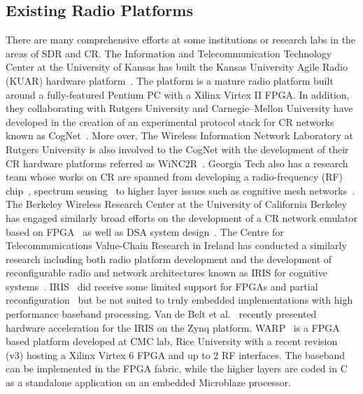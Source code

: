\subsection{Existing Radio Platforms}
There are many comprehensive efforts at some institutions or research labs in the areas of SDR and CR. 
The Information and Telecommunication Technology Center at the University of Kansas has built the Kansas University Agile Radio (KUAR) hardware platform~\cite{Minden2007}. 
The platform is a mature radio platform built around a fully-featured Pentium PC with a Xilinx Virtex II FPGA.
In addition, they collaborating with Rutgers University and Carnegie–Mellon University have developed in the creation of an experimental protocol stack for CR networks known as CogNet~\cite{Raychaudhuri2006}. 
More over, The Wireless Information Network Laboratory at Rutgers University is also involved to the CogNet with the development of their CR hardware platforms referred as WiNC2R~\cite{Miljanic2007}.
Georgia Tech also has a research team whose works on CR are spanned from developing a radio-frequency (RF) chip~\cite{Mukhopadhyay2005}, spectrum sensing~\cite{Ganesan2005} to higher layer issues such as cognitive mesh networks~\cite{Chowdhury2008}. 
The Berkeley Wireless Research Center at the University of California Berkeley has engaged similarly broad efforts on the development of a CR network emulator based on FPGA~\cite{So2008} as well as DSA system design~\cite{Mishra2006}.
The Centre for Telecommunications Value-Chain Research in Ireland has conducted a similarly research including both radio platform development and the development of reconfigurable radio and network architectures known as IRIS for cognitive systems~\cite{Sutton2006}. IRIS~\cite{Sutton2010} did receive some limited support for FPGAs and partial reconfiguration~\cite{fahmy2009,lotze2009} but be not suited to truly embedded implementations with high performance baseband processing. Van de Belt et al.~\cite{Belt2013} recently presented hardware acceleration for the IRIS on the Zynq platform.
WARP~\cite{amiri2007} is a FPGA based platform developed at CMC lab, Rice University with a recent revision (v3) hosting a Xilinx Virtex 6 FPGA and up to 2 RF interfaces. The baseband can be implemented in the FPGA fabric, while the higher layers are coded in C as a standalone application on an embedded Microblaze processor.

